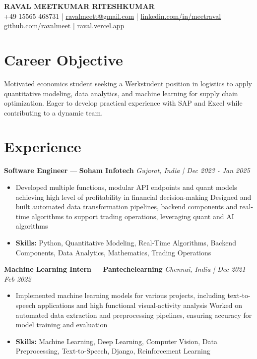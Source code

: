 \documentclass[a4paper,10pt]{article}
\begin{document}
\begin{center}
  {\Large\bfseries RAVAL MEETKUMAR RITESHKUMAR}\\[2pt]
  {\small +49 15565 468731 \;|\; \href{mailto:ravalmeett@gmail.com}{ravalmeett@gmail.com} \;|\; \href{https://www.linkedin.com/in/meetraval/}{linkedin.com/in/meetraval} \;|\; \href{https://github.com/ravalmeet}{github.com/ravalmeet} \;|\; \href{https://raval.vercel.app/}{raval.vercel.app}}
\end{center}
\vspace{-3pt}

\section*{Career Objective}
Motivated economics student seeking a Werkstudent position in logistics to apply quantitative modeling, data analytics, and machine learning for supply chain optimization. Eager to develop practical experience with SAP and Excel while contributing to a dynamic team.\par

\section*{Experience}
\textbf{Software Engineer} — \textbf{Soham Infotech} \hfill \textit{Gujarat, India \;|\; Dec 2023 - Jan 2025}\par
\vspace{1pt}
\begin{itemize}
  \item Developed multiple functions, modular API endpoints and quant models achieving high level of profitability in financial decision-making Designed and built automated data transformation pipelines, backend components and real-time algorithms to support trading operations, leveraging quant and AI algorithms
  \item \textbf{Skills:} Python, Quantitative Modeling, Real-Time Algorithms, Backend Components, Data Analytics, Mathematics, Trading Operations
\end{itemize}
\vspace{3pt}
\textbf{Machine Learning Intern} — \textbf{Pantechelearning} \hfill \textit{Chennai, India \;|\; Dec 2021 - Feb 2022}\par
\vspace{1pt}
\begin{itemize}
  \item Implemented machine learning models for various projects, including text-to-speech applications and high functional visual-activity analysis Worked on automated data extraction and preprocessing pipelines, ensuring accuracy for model training and evaluation
  \item \textbf{Skills:} Machine Learning, Deep Learning, Computer Vision, Data Preprocessing, Text-to-Speech, Django, Reinforcement Learning
\end{itemize}
\end{document}

